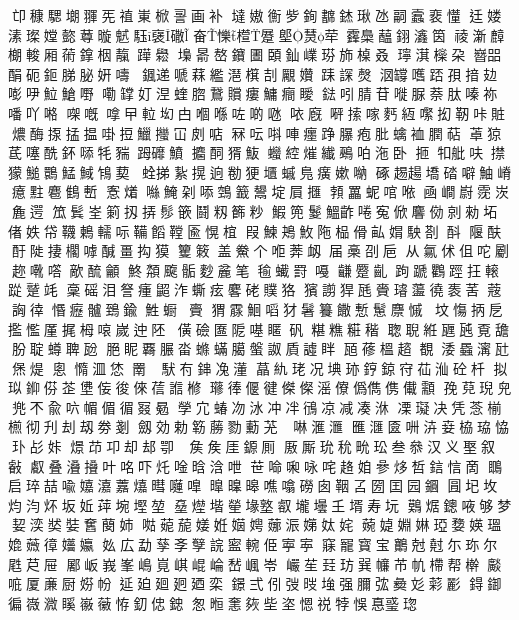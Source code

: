 𠨑穅騦㙟𦑩𠀡禃崬𣔙䛐画补
墶㜜𢖍㱔銁𢅺錰𤧐氹𠻸蠧裵𢤦
𨑳𡞱溸𤨪𡠠㦤䔿暶𩲭𩢤襃䃟
𡘊㦡𣜯𨃨𡏅熭荦𩆨䲷𧂯𨦫𤅺筃
祾澵𪋟樃𨌘厢𦸇鎿栶靝𨅯𦦵
𡏭𣈯嶅𨰰圕頣𨥉嶫𤦈斾槕叒
𤪥𣾁㰑朶𡾡㗊䣺砈鉕䏲䏟姸嚋
𩗩递嗁䔉繿潖檱㓤𧢝㜺𨀤𧨾
㷫𣲷𦉘嚿踎孭揞攰嘭吚𩶘䱽嘢
嘞罉奵𣵀蝰脗鵞贘瘻鱅癎瞹
鍅吲腈苷嘥脲萘肽嗪祢噃吖𠺝
㗎嘅嗱曱𨋢㘭甴嗰喺咗啲𠱁
𠲖廐𠹶𢱢𠺢麫絚𡁵抝靭咔賍
燶酶揼掹揾啩𢭃鱲𢺳冚㓟𠶧
冧呍唞唓癦踭𦢊疱肶蠄裇膶萜
䓬猄茋噻酰鈈𠻹牦䝎𧿹䃺鱝
攟䣳𤟠𩵼𧖣𦁈熣纎鵐㕷沲卧
㧜𤘘舭呋㩒獴𩺬䴉鯭䱛𩿞葜
𧊲挮紥㨪逈勌㹴㙺䗩𠒎癀嫰𠺶
硺䞶𧼮墧䂿噼鮋嵴癔𪐴麅䳡㟻
愙𤏲噝𩸆刴㖭鵼籖鬹埞屓擓
𩓐𦌵蚭𠴨𠵱凾𡼏嶎霃𡷑麁遌
笟鬂峑箣扨挵髿篏鬪籾籂粆
鰕篼鬉鰮齚啳寃俽麘俲剠勑坧
偖妷帒韈鶫轜呩鞴饀鞺匬愰椬
叚鰊鴂䰻陁榀傦畆𡝭駚剳酙
隁酜𫑳酑𨺗捿櫊嘑醎畺抅獏
籰𥰡盖鮝个𠳔莾衂届槀刟巵
从氱𠇲伹咜劚趂㗾㗳歒酼龥
鮗頮颴骺麨麄笔毺蠘罸嘠
𪙊蹷齓跔蹏鸜踁抂𨍽踨蹵竓
稾磘泪詧瘇鼦泎蟖痃𪊲硓贌狢
獱謭猂瓱賫𤪻蘯徺袠䒷𦸅𪹧
詾𢔛惽癧髗鵄鍮鮏蟵𭼼賷
猬霡鮰㗖犲䰇籑饊慙䰄麖慽
坟慯抦戹㩜懢厪捤栂㗒嵗迚𨸹
僙礆匲阸𠼻䁥矾糂𥼚糚稭
聦聣絍甅瓲覔舚朌聢𧒆聛瓰
脃眤覉𦟌畓螩蟎臈螌詉貭譃眫
瓸蓚榲趦覩涹蟁𤀑瓧㷛煶
悤憜㳑恷罱牐惩䭾𠕇鋛𠗟𣿅
蕌䊵珯况㙉𤥂𨧤鍄𡧛苮𣳈砼杄
拟𤤳𨦪𠊠𦮳𡌅侫𢓭倈𦴩𧪄𣘀
𤪱𢔓𠍾徤𠎀𠍇滛𠐟僞儁㑺儎顬
㝃萖𤦤𠒇兠𣎴兪𠯿𢃼𠋥𢔰𠖎𣈳
𡦃宂蝽𠖳𣲙冲冸鴴凉减凑㳜
凓𤪦决凭菍椾𣜭彻刋刦刼劵剗
劔効勅簕蕂勠蘍𦬓包𨫞啉滙𣾀
𠥔𣿬匳𠯢泋𡜦栛珕恊㺪㣌𡛨
燝䒢卭却𨚫卾卿𡖖𡘓矦厓𨪛厠
厫厮玧𥝲㽙玜叁叅汉义埾叙㪫
𠮏叠𣿫𢶣叶𠱷吓灹唫晗浛呭
𦭓𠵴啝咏咤䞦𡜍𠻝㶴𠵍𨦼𢚘啇
䳭启琗喆喩𡣗𤀺䕒𤐵暳𡂴嘷
曍𣊊暤噍噏磱囱鞇叾圀囯园𨭦
㘣𡉏坆𤆥汮炋坂㚱𦱾埦𡐖堃
𡑔𤍣堦𤯵堟墪㕡壠壜𡈼壻寿坃
𪅐𤉸鏓㖡够梦㛃湙𡘾娤𡚒蔅姉
𠵎𦲁𦴪𡟜姙𡟻𡞲𦶦浱𡠨𡛕姹
𦹅媫婣㛦𤦩㜈媖瑥嫓𦾡𢕔𡤑㜲
𡚸広勐孶斈孼𧨎䀄䡝𠈄寕𡨴
𥧌𠖥寳宝䴐尅𡭄尓珎尔𡲥𦬨屉
䣝岅峩峯嶋𡷹𡸷崐崘嵆𡺤岺
巗苼㠭𤤁𢁉𢅳芇㠶㯂帮檊𤒼
𠳓厦亷厨𡝱帉𨒂廹廻㢠廼栾
鐛弍𠇁弢㫞𡌺强𦢈𢏐𢑱彣𦹮彲
鍀𨨶徧嶶㵟𥉐𡽪𧃸𢙨釖𠊞𨨩
怱暅㥣㷇㘹垐𢞴祱㹀悞惪𤦂𤦏

